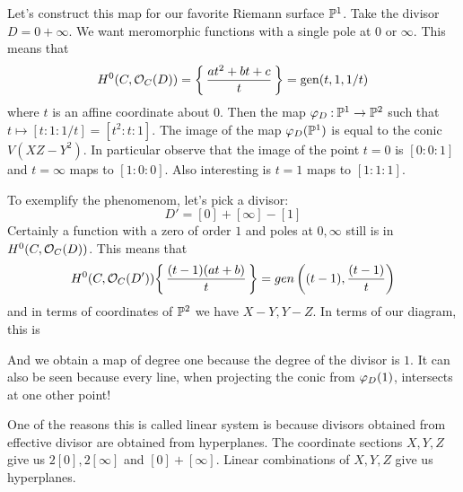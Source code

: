 \documentclass[12pt]{memoir}
\begin{document}
\begin{Ex}
    Let's construct this map for our favorite Riemann surface $\mathbb{P}^1$. Take the divisor $D=0+\infty$. We want meromorphic functions with a single pole at $0$ or $\infty$. This means that 
    $$H^0(C,\mathcal{O}_C(D))=\biggl\{\,\frac{at^2+bt+c}{t}\,\biggr\}=\operatorname{gen}(t,1,1/t)$$
    where $t$ is an affine coordinate about $0$. Then the map $\varphi_D\mathbin{:}\mathbb{P}^1\to\mathbb{P}^2$ such that $t\mapsto [t:1:1/t]=[t^2:t:1]$. The image of the map $\varphi_D(\mathbb{P}^1)$ is equal to the conic $V(XZ-Y^2)$. In particular observe that the image of the point $t=0$ is $[0:0:1]$ and $t=\infty$ maps to $[1:0:0]$. Also interesting is $t=1$ maps to $[1:1:1]$.\par
    To exemplify the phenomenom, let's pick a divisor:
    $$D'=[0]+[\infty]-[1]$$
    Certainly a function with a zero of order $1$ and poles at $0,\infty$ still is in $H^0(C,\mathcal{O}_C(D))$. This means that 
    $$H^0(C,\mathcal{O}_C(D'))\biggl\{\,\frac{(t-1)(at+b)}{t}\,\biggr\}=gen\left((t-1),\frac{(t-1)}{t}\right)$$
    and in terms of coordinates of $\mathbb{P}^2$ we have $X-Y,Y-Z$. In terms of our diagram, this is
    \begin{center}
    \end{center}
    And we obtain a map of degree one because the degree of the divisor is $1$. It can also be seen because every line, when projecting the conic from $\varphi_D(1)$, intersects at one other point!
\end{Ex}

\begin{Rmk}
    
One of the reasons this is called linear system is because divisors obtained from effective divisor are obtained from hyperplanes. The coordinate sections $X,Y,Z$ give us $2[0],2[\infty]$ and $[0]+[\infty]$. Linear combinations of $X,Y,Z$ give us hyperplanes. 
\end{Rmk}
\end{document}
